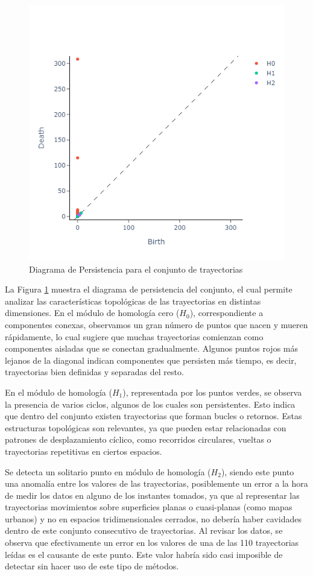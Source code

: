\begin{figure}[htbp]
    \centering
    \includegraphics[width=0.7\linewidth]{images/persistencia.png}
    \caption{Diagrama de Persistencia para el conjunto de trayectorias}
    \label{fig:pers_varias}
\end{figure}

La Figura \ref{fig:pers_varias} muestra el diagrama de persistencia del conjunto, el cual permite analizar las características topológicas de las trayectorias en distintas dimensiones. En el módulo de homología cero ($H_0$), correspondiente a componentes conexas, observamos un gran número de puntos que nacen y mueren rápidamente, lo cual sugiere que muchas trayectorias comienzan como componentes aisladas que se conectan gradualmente. Algunos puntos rojos más lejanos de la diagonal indican componentes que persisten más tiempo, es decir, trayectorias bien definidas y separadas del resto.

En el módulo de homología ($H_1$), representada por los puntos verdes, se observa la presencia de varios ciclos, algunos de los cuales son persistentes. Esto indica que dentro del conjunto existen trayectorias que forman bucles o retornos. Estas estructuras topológicas son relevantes, ya que pueden estar relacionadas con patrones de desplazamiento cíclico, como recorridos circulares, vueltas o trayectorias repetitivas en ciertos espacios.

Se detecta un solitario punto en módulo de homología ($H_2$), siendo este punto una anomalía entre los valores de las trayectorias, posiblemente un error a la hora de medir los datos en alguno de los instantes tomados, ya que al representar las trayectorias movimientos sobre superficies planas o cuasi-planas (como mapas urbanos) y no en espacios tridimensionales cerrados, no debería haber cavidades dentro de este conjunto consecutivo de trayectorias. Al revisar los datos, se observa que efectivamente un error en los valores de una de las 110 trayectorias leídas es el causante de este punto. Este valor habría sido casi imposible de detectar sin hacer uso de este tipo de métodos.

